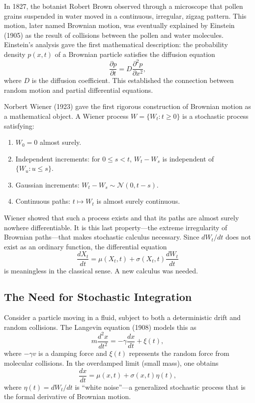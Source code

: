 In 1827, the botanist Robert Brown observed through a microscope that pollen grains suspended in water moved in a continuous, irregular, zigzag pattern. This motion, later named Brownian motion, was eventually explained by Einstein (1905) as the result of collisions between the pollen and water molecules. Einstein's analysis gave the first mathematical description: the probability density \(p(x,t)\) of a Brownian particle satisfies the diffusion equation
\[
\frac{\partial p}{\partial t} = D \frac{\partial^2 p}{\partial x^2},
\]
where \(D\) is the diffusion coefficient. This established the connection between random motion and partial differential equations.

Norbert Wiener (1923) gave the first rigorous construction of Brownian motion as a mathematical object. A Wiener process \(W = \{W_t : t \geq 0\}\) is a stochastic process satisfying:
\begin{enumerate}
    \item \(W_0 = 0\) almost surely.
    \item Independent increments: for \(0 \leq s < t\), \(W_t - W_s\) is independent of \(\{W_u : u \leq s\}\).
    \item Gaussian increments: \(W_t - W_s \sim \mathcal{N}(0, t-s)\).
    \item Continuous paths: \(t \mapsto W_t\) is almost surely continuous.
\end{enumerate}

Wiener showed that such a process exists and that its paths are almost surely nowhere differentiable. It is this last property---the extreme irregularity of Brownian paths---that makes stochastic calculus necessary. Since \(dW_t/dt\) does not exist as an ordinary function, the differential equation
\[
\frac{dX_t}{dt} = \mu(X_t, t) + \sigma(X_t, t) \frac{dW_t}{dt}
\]
is meaningless in the classical sense. A new calculus was needed.

\subsection{The Need for Stochastic Integration}

Consider a particle moving in a fluid, subject to both a deterministic drift and random collisions. The Langevin equation (1908) models this as
\[
m \frac{d^2 x}{dt^2} = -\gamma \frac{dx}{dt} + \xi(t),
\]
where \(-\gamma v\) is a damping force and \(\xi(t)\) represents the random force from molecular collisions. In the overdamped limit (small mass), one obtains
\[
\frac{dx}{dt} = \mu(x,t) + \sigma(x,t) \eta(t),
\]
where \(\eta(t) = dW_t/dt\) is ``white noise''---a generalized stochastic process that is the formal derivative of Brownian motion.


